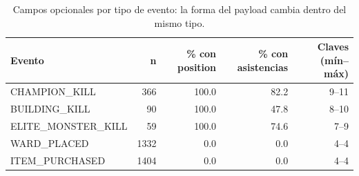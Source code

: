 \begin{table}[H]
\centering
\small
\caption{Campos opcionales por tipo de evento: la forma del payload cambia dentro del mismo tipo.}
\label{tab:opcionales}
\begin{tabular}{lrrrr}
\toprule
Evento & n & \% con position & \% con asistencias & Claves (mín--máx) \\
\midrule
CHAMPION\_KILL & 366 & 100.0 & 82.2 & 9--11 \\
BUILDING\_KILL & 90 & 100.0 & 47.8 & 8--10 \\
ELITE\_MONSTER\_KILL & 59 & 100.0 & 74.6 & 7--9 \\
WARD\_PLACED & 1332 & 0.0 & 0.0 & 4--4 \\
ITEM\_PURCHASED & 1404 & 0.0 & 0.0 & 4--4 \\
\bottomrule
\end{tabular}
\end{table}
